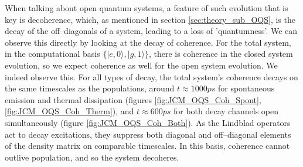 \documentclass[12pt]{article}
\begin{document}
When talking about open quantum systems, a feature of such evolution that is key is decoherence, which, as mentioned in section \ref{sec:theory_sub_OQS}, is the decay of the off--diagonals of a system, leading to a loss of 'quantumness'. We can observe this directly by looking at the decay of coherence. For the total system, in the computational basis $\{|e,0\rangle, |g,1\rangle\}$, there is coherence in the closed system evolution, so we expect coherence as well for the open system evolution. We indeed observe this. For all types of decay, the total system's coherence decays on the same timescales as the populations, around $t \approx 1000ps$ for spontaneous emission and thermal dissipation (figures \ref{fig:JCM_OQS_Coh_Spont}, \ref{fig:JCM_OQS_Coh_Therm}), and $ t \approx 600ps$ for both decay channels open simultaneously (figure \ref{fig:JCM_OQS_Coh_Both}). As the Lindblad operators act to decay excitations, they suppress both diagonal and off–diagonal elements of the density matrix on comparable timescales. In this basis, coherence cannot outlive population, and so the system decoheres.\\
\\
\end{document}
